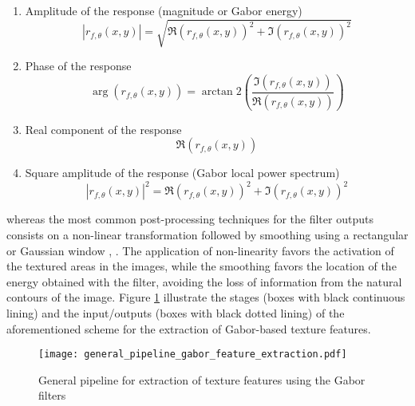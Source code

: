 \begin{enumerate}
    \item Amplitude of the response (magnitude or Gabor energy) \cite{Bovik.Clark.ea:TPAMI:1990}
        \begin{equation}\label{eq:gabor_magnitude}
            |r_{f, \theta}(x,y)| = \sqrt{\Re{(r_{f, \theta}(x, y))}^2 + \Im{(r_{f, \theta}(x, y))}^2}
        \end{equation}
    \item Phase of the response \cite{Palm.Lehmann:MGV:2002}
    \begin{equation}\label{eq:gabor_phase}
            \arg(r_{f, \theta}(x,y)) = \arctan2{\left(\frac{\Im{(r_{f, \theta}(x, y))}}{\Re{(r_{f, \theta}(x, y))}}\right)}
        \end{equation}
    \item Real component of the response \cite{Jain.Farrokhnia:IJPR:1991}
    \begin{equation}\label{eq:gabor_real_part}
            \Re{(r_{f, \theta}(x, y))}
        \end{equation}
    \item Square amplitude of the response (Gabor local power spectrum) \cite{Grigorescu.Petkov.ea:TIP:2002}
    \begin{equation}\label{eq:gabor_power}
            |r_{f, \theta}(x,y)|^2 = \Re{(r_{f, \theta}(x, y))}^2 + \Im{(r_{f, \theta}(x, y))}^2
        \end{equation}
\end{enumerate}
whereas the most common post-processing techniques for the filter outputs consists on a non-linear transformation followed by smoothing using a rectangular or Gaussian window \cite{Randen.Husoy:TPAMI:1999}, \cite{Clausi.EdJernigan:JPR:2000}. 
The application of non-linearity favors the activation of the textured areas in the images, while the smoothing favors the location of the energy obtained with the filter, avoiding the loss of information from the natural contours of the image. Figure \ref{fig:general_pipeline_gabor_feature_extraction} illustrate the stages (boxes with black continuous lining) and the input/outputs (boxes with black dotted lining) of the aforementioned scheme for the extraction of Gabor-based texture features.

\begin{figure}[h!]
\centering
\texttt{[image: general\_pipeline\_gabor\_feature\_extraction.pdf]}
\caption{General pipeline for extraction of texture features using the Gabor filters}\label{fig:general_pipeline_gabor_feature_extraction}
\end{figure}


